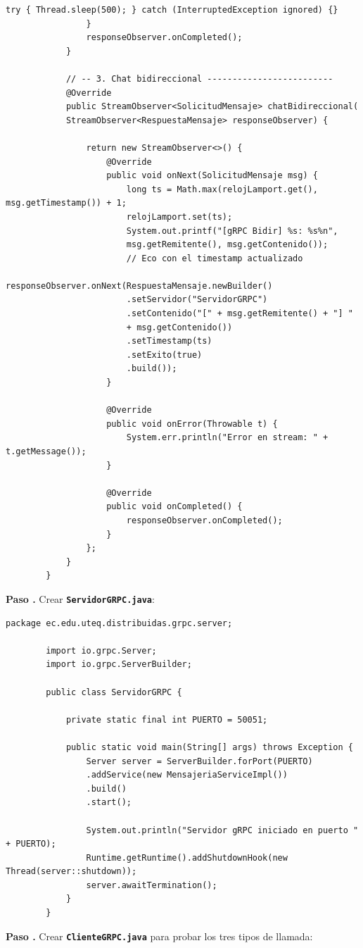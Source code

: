 \documentclass[12pt, a4paper, openany]{book}
\newcounter{paso}[section]
\newcommand{\paso}[1]{%
	\stepcounter{paso}%
	\medskip\noindent
	\begin{tcolorbox}[enhanced, colback=white, colframe=practiceBlue,
		boxrule=0.8pt, arc=3pt, left=6pt, right=6pt, top=4pt, bottom=4pt,
		before upper={\noindent}]
		\textcolor{practiceBlue}{\textbf{Paso \arabic{paso}.}} #1
	\end{tcolorbox}%
}
\newcommand{\archivo}[1]{\texttt{\textbf{#1}}}
\begin{document}
\begin{lstlisting}[style=JavaStyle, caption={MensajeriaServiceImpl.java --- Implementación de los tres tipos de llamada}]
					try { Thread.sleep(500); } catch (InterruptedException ignored) {}
				}
				responseObserver.onCompleted();
			}
			
			// -- 3. Chat bidireccional -------------------------
			@Override
			public StreamObserver<SolicitudMensaje> chatBidireccional(
			StreamObserver<RespuestaMensaje> responseObserver) {
				
				return new StreamObserver<>() {
					@Override
					public void onNext(SolicitudMensaje msg) {
						long ts = Math.max(relojLamport.get(), msg.getTimestamp()) + 1;
						relojLamport.set(ts);
						System.out.printf("[gRPC Bidir] %s: %s%n",
						msg.getRemitente(), msg.getContenido());
						// Eco con el timestamp actualizado
						responseObserver.onNext(RespuestaMensaje.newBuilder()
						.setServidor("ServidorGRPC")
						.setContenido("[" + msg.getRemitente() + "] "
						+ msg.getContenido())
						.setTimestamp(ts)
						.setExito(true)
						.build());
					}
					
					@Override
					public void onError(Throwable t) {
						System.err.println("Error en stream: " + t.getMessage());
					}
					
					@Override
					public void onCompleted() {
						responseObserver.onCompleted();
					}
				};
			}
		}
	\end{lstlisting}
	
	\paso{Crear \archivo{ServidorGRPC.java}:}
	
	\begin{lstlisting}[style=JavaStyle, caption={ServidorGRPC.java --- Servidor gRPC sobre HTTP/2}]
		package ec.edu.uteq.distribuidas.grpc.server;
		
		import io.grpc.Server;
		import io.grpc.ServerBuilder;
		
		public class ServidorGRPC {
			
			private static final int PUERTO = 50051;
			
			public static void main(String[] args) throws Exception {
				Server server = ServerBuilder.forPort(PUERTO)
				.addService(new MensajeriaServiceImpl())
				.build()
				.start();
				
				System.out.println("Servidor gRPC iniciado en puerto " + PUERTO);
				Runtime.getRuntime().addShutdownHook(new Thread(server::shutdown));
				server.awaitTermination();
			}
		}
	\end{lstlisting}
	
	\paso{Crear \archivo{ClienteGRPC.java} para probar los tres tipos de llamada:}
	
\end{document}
